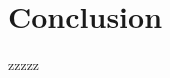 \documentclass[acmsmall,screen]{acmart}
\begin{document}
%
%
%  
%  
 
\section{Conclusion}
zzzzz
 

\end{document}
